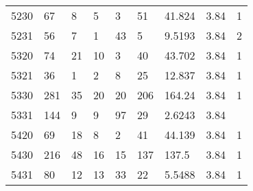 \begin{longtable}{lllllllll}
5230 & 67            & 8                & 5                  & 3                & 51                 & \cellcolor[HTML]{9AFF99}41.824 & 3.84 & \cellcolor[HTML]{FFCC67}1 \\
5231 & 56            & 7                & 1                  & 43               & 5                  & \cellcolor[HTML]{9AFF99}9.5193 & 3.84 & \cellcolor[HTML]{96FFFB}2 \\
5320 & 74            & 21               & 10                 & 3                & 40                 & \cellcolor[HTML]{9AFF99}43.702 & 3.84 & \cellcolor[HTML]{FFCC67}1 \\
5321 & 36            & 1                & 2                  & 8                & 25                 & \cellcolor[HTML]{9AFF99}12.837 & 3.84 & \cellcolor[HTML]{FFCC67}1 \\
5330 & 281           & 35               & 20                 & 20               & 206                & \cellcolor[HTML]{9AFF99}164.24 & 3.84 & \cellcolor[HTML]{FFCC67}1 \\
5331 & 144           & 9                & 9                  & 97               & 29                 & \cellcolor[HTML]{FFCCC9}2.6243 & 3.84 &  \\
5420 & 69            & 18               & 8                  & 2                & 41                 & \cellcolor[HTML]{9AFF99}44.139 & 3.84 & \cellcolor[HTML]{FFCC67}1 \\
5430 & 216           & 48               & 16                 & 15               & 137                & \cellcolor[HTML]{9AFF99}137.5  & 3.84 & \cellcolor[HTML]{FFCC67}1 \\
5431 & 80            & 12               & 13                 & 33               & 22                 & \cellcolor[HTML]{9AFF99}5.5488 & 3.84 & \cellcolor[HTML]{FFCC67}1 \\ \hline
\end{longtable}